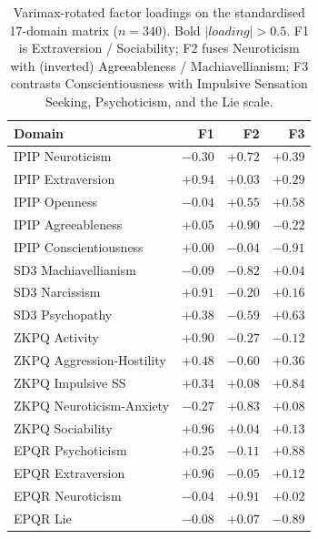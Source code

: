 \documentclass{article}
\begin{document}
\begin{table}[t]
\centering
\small
\begin{tabular}{lrrr}
\toprule
Domain & F1 & F2 & F3 \\
\midrule
IPIP Neuroticism                  & $-0.30$       & $\mathbf{+0.72}$ & $+0.39$       \\
IPIP Extraversion                 & $\mathbf{+0.94}$ & $+0.03$       & $+0.29$       \\
IPIP Openness                     & $-0.04$       & $\mathbf{+0.55}$ & $\mathbf{+0.58}$ \\
IPIP Agreeableness                & $+0.05$       & $\mathbf{+0.90}$ & $-0.22$       \\
IPIP Conscientiousness            & $+0.00$       & $-0.04$       & $\mathbf{-0.91}$ \\
SD3 Machiavellianism              & $-0.09$       & $\mathbf{-0.82}$ & $+0.04$       \\
SD3 Narcissism                    & $\mathbf{+0.91}$ & $-0.20$       & $+0.16$       \\
SD3 Psychopathy                   & $+0.38$       & $\mathbf{-0.59}$ & $\mathbf{+0.63}$ \\
ZKPQ Activity                     & $\mathbf{+0.90}$ & $-0.27$       & $-0.12$       \\
ZKPQ Aggression-Hostility         & $+0.48$       & $\mathbf{-0.60}$ & $+0.36$       \\
ZKPQ Impulsive SS                 & $+0.34$       & $+0.08$       & $\mathbf{+0.84}$ \\
ZKPQ Neuroticism-Anxiety          & $-0.27$       & $\mathbf{+0.83}$ & $+0.08$       \\
ZKPQ Sociability                  & $\mathbf{+0.96}$ & $+0.04$       & $+0.13$       \\
EPQR Psychoticism                 & $+0.25$       & $-0.11$       & $\mathbf{+0.88}$ \\
EPQR Extraversion                 & $\mathbf{+0.96}$ & $-0.05$       & $+0.12$       \\
EPQR Neuroticism                  & $-0.04$       & $\mathbf{+0.91}$ & $+0.02$       \\
EPQR Lie                          & $-0.08$       & $+0.07$       & $\mathbf{-0.89}$ \\
\bottomrule
\end{tabular}
\caption{Varimax-rotated factor loadings on the standardised 17-domain matrix ($n=340$). Bold $|loading| > 0.5$. F1 is Extraversion / Sociability; F2 fuses Neuroticism with (inverted) Agreeableness / Machiavellianism; F3 contrasts Conscientiousness with Impulsive Sensation Seeking, Psychoticism, and the Lie scale.}
\label{tab:efa-loadings}
\end{table}
\end{document}
